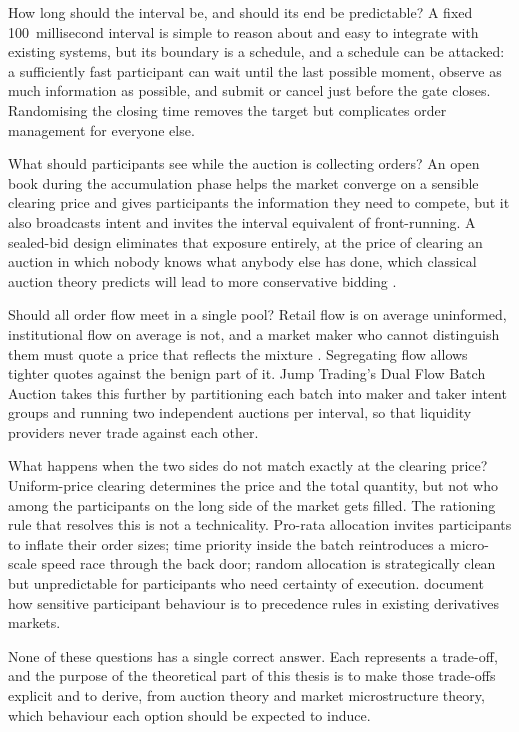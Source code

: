 How long should the interval be, and should its end be predictable? A
fixed 100~millisecond interval is simple to reason about and easy to
integrate with existing systems, but its boundary is a schedule, and a
schedule can be attacked: a sufficiently fast participant can wait until
the last possible moment, observe as much information as possible, and
submit or cancel just before the gate closes. Randomising the closing
time removes the target but complicates order management for everyone
else.

What should participants see while the auction is collecting orders? An
open book during the accumulation phase helps the market converge on a
sensible clearing price and gives participants the information they need
to compete, but it also broadcasts intent and invites the interval
equivalent of front-running. A sealed-bid design eliminates that
exposure entirely, at the price of clearing an auction in which nobody
knows what anybody else has done, which classical auction theory
predicts will lead to more conservative bidding
\citep{vickrey1961counterspeculation,klemperer1999auction}.

Should all order flow meet in a single pool? Retail flow is on average
uninformed, institutional flow on average is not, and a market maker who
cannot distinguish them must quote a price that reflects the mixture
\citep{glosten1985bid}. Segregating flow allows tighter quotes against
the benign part of it. Jump Trading's Dual Flow Batch Auction takes this
further by partitioning each batch into maker and taker intent groups
and running two independent auctions per interval, so that liquidity
providers never trade against each other.

What happens when the two sides do not match exactly at the clearing
price? Uniform-price clearing determines the price and the total
quantity, but not who among the participants on the long side of the
market gets filled. The rationing rule that resolves this is not a
technicality. Pro-rata allocation invites participants to inflate their
order sizes; time priority inside the batch reintroduces a micro-scale
speed race through the back door; random allocation is strategically
clean but unpredictable for participants who need certainty of
execution. \citet{haynes2020precedence} document how sensitive
participant behaviour is to precedence rules in existing derivatives
markets.

None of these questions has a single correct answer. Each represents a
trade-off, and the purpose of the theoretical part of this thesis is to
make those trade-offs explicit and to derive, from auction theory and
market microstructure theory, which behaviour each option should be
expected to induce.

